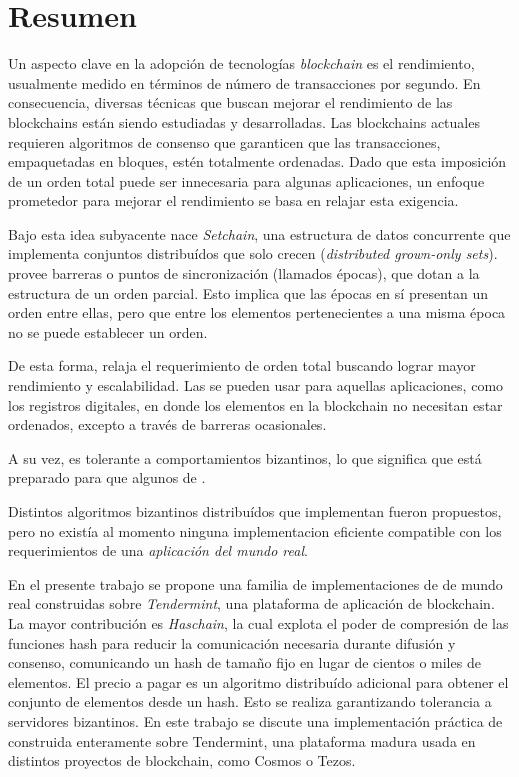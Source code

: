   \chapter*{Resumen}
  Un aspecto clave en la adopción de tecnologías \textit{blockchain} es el rendimiento,
  usualmente medido en términos de número de transacciones por segundo.
  En consecuencia, diversas técnicas que buscan mejorar el rendimiento de las blockchains
  están siendo estudiadas y desarrolladas.
  Las blockchains actuales requieren algoritmos de consenso que garanticen que las
  transacciones, empaquetadas en bloques, estén totalmente ordenadas.
  Dado que esta imposición de un orden total puede ser innecesaria para algunas aplicaciones,
  un enfoque prometedor para mejorar el rendimiento se basa en relajar esta exigencia.

  Bajo esta idea subyacente nace \textit{Setchain}, una estructura de
  datos concurrente que implementa conjuntos distribuídos que solo crecen
  (\textit{distributed grown-only sets}).
  \setchain provee barreras o puntos de sincronización
  (llamados épocas), que dotan a la estructura de un orden parcial.
  Esto implica que las épocas en sí presentan un orden entre ellas,
  pero que entre los elementos pertenecientes a una misma época no
  se puede establecer un orden.

  De esta forma, relaja el requerimiento de orden total buscando lograr mayor
  rendimiento y escalabilidad.
  Las \setchains se pueden usar para aquellas aplicaciones, como los registros digitales,
  en donde los elementos en la blockchain no necesitan estar ordenados, excepto a través
  de barreras ocasionales.
  
  A su vez, \setchain es tolerante a comportamientos bizantinos, lo que significa que
  está preparado para que algunos de .
  
  Distintos algoritmos bizantinos distribuídos que implementan \setchain fueron
  propuestos, pero no existía al momento ninguna implementacion eficiente compatible con
  los requerimientos de una \textit{aplicación del mundo real}.
  
  En el presente trabajo se propone una familia de implementaciones de \setchain 
  de mundo real construidas sobre \textit{Tendermint}, una plataforma de
  aplicación de blockchain.  
  La mayor contribución es \textit{Haschain}, la cual explota el poder de compresión de las
  funciones hash para reducir la comunicación necesaria durante difusión y consenso,
  comunicando un hash de tamaño fijo en lugar de cientos o miles de elementos.
  El precio a pagar es un algoritmo distribuído adicional para obtener el conjunto de
  elementos desde un hash. Esto se realiza garantizando tolerancia a servidores bizantinos.
  En este trabajo se discute una implementación práctica de \hashchain construida enteramente
  sobre Tendermint, una plataforma madura usada en distintos proyectos de blockchain, como
  Cosmos o Tezos.

